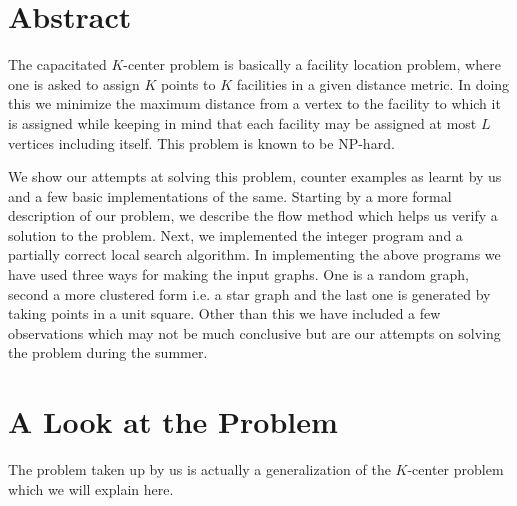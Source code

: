 \documentclass[12pt,a4paper,onecolumn]{article}
\begin{document}
\maketitle
\tableofcontents
\section{Abstract}
The capacitated $K$-center problem is basically a facility location problem, where one is asked to assign $K$ points to $K$ facilities in a given distance metric. In doing this we minimize
the maximum distance from a vertex to the facility to which it is assigned while keeping in mind that each facility may be assigned at most $L$ vertices including itself. This problem is known to be NP-hard.

We show our attempts at solving this problem, counter examples as learnt by us and a few basic implementations of the same. Starting by a more formal description of our problem, we describe the flow method which helps us verify a solution to the problem. Next, we implemented the integer program and a partially correct local search algorithm. In implementing the above programs we have used three ways for making the input graphs. One is a random graph, second a more clustered form i.e. a star graph and the last one is generated by taking points in a unit square. Other than this we have included a few observations which may not be much conclusive but are our attempts on solving the problem during the summer.
\section{A Look at the Problem}
The problem taken up by us is actually a generalization of the $K$-center problem which we will explain here. 
\end{document}
